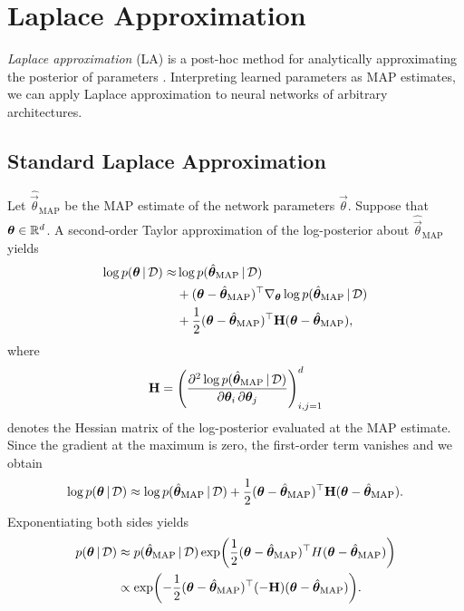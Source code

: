 \section{Laplace Approximation}
\label{sec:la}

\emph{Laplace approximation} (LA) is a post-hoc method for analytically approximating the posterior of parameters \citep{daxbergerLaplaceRedux2021}. Interpreting learned parameters as MAP estimates, we can apply Laplace approximation to neural networks of arbitrary architectures.

\subsection{Standard Laplace Approximation}

Let $\hat{\vec{\theta}}_\text{MAP}$ be the MAP estimate of the network parameters $\vec{\theta}$. Suppose that $\bm{\theta} \in \mathbb{R}^d$. A second-order Taylor approximation of the log-posterior about $\hat{\vec{\theta}}_\text{MAP}$ yields
\begin{align*}
  \log p(\bm{\theta} \,|\, \mathcal{D}) \approx& \log p(\hat{\bm{\theta}}_\text{MAP} \,|\, \mathcal{D}) \\
  &+ (\bm{\theta} - \hat{\bm{\theta}}_\text{MAP})^\top \nabla_{\bm{\theta}} \log p(\hat{\bm{\theta}}_\text{MAP} \,|\, \mathcal{D}) \\
  &+ \frac{1}{2} (\bm{\theta} - \hat{\bm{\theta}}_\text{MAP})^\top \bm{\mathbf{H}} (\bm{\theta} - \hat{\bm{\theta}}_\text{MAP}),
\end{align*}
where
\begin{equation} \label{eq:hessian}
  \bm{\mathbf{H}} = \left( \pdv{\log p(\hat{\bm{\theta}}_\text{MAP} \,|\,\mathcal{D})}{\bm{\theta}_i, \bm{\theta}_j} \right)_{i,j=1}^{d}
\end{equation}
denotes the Hessian matrix of the log-posterior evaluated at the MAP estimate. Since the gradient at the maximum is zero, the first-order term vanishes and we obtain
\begin{equation*}
  \log p(\bm{\theta} \,|\, \mathcal{D}) \approx  \log p(\hat{\bm{\theta}}_\text{MAP} \,|\, \mathcal{D}) + \frac{1}{2} (\bm{\theta} - \hat{\bm{\theta}}_\text{MAP})^\top \bm{\mathbf{H}} (\bm{\theta} - \hat{\bm{\theta}}_\text{MAP}).
\end{equation*}
Exponentiating both sides yields
\begin{align*}
  p(\vec{\theta} \given \mathcal{D}) &\approx p(\hat{\vec{\theta}}_\text{MAP} \given \mathcal{D}) \exp\mleft( \frac{1}{2} (\vec{\theta} - \hat{\vec{\theta}}_\text{MAP})^\T H (\vec{\theta} - \hat{\vec{\theta}}_\text{MAP}) \mright) \\
  &\propto \exp\mleft( - \frac{1}{2} (\vec{\theta} - \hat{\vec{\theta}}_\text{MAP})^\T (-\mat{H}) (\vec{\theta} - \hat{\vec{\theta}}_\text{MAP}) \mright).
\end{align*}
